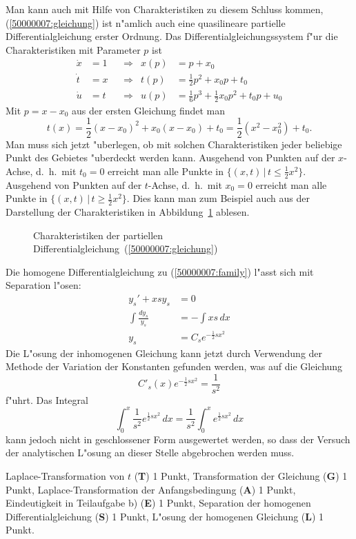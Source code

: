 \begin{loesung}
\begin{teilaufgaben}
Man kann auch mit Hilfe von Charakteristiken zu diesem Schluss kommen, 
(\ref{50000007:gleichung}) ist n"amlich auch eine quasilineare partielle
Differentialgleichung erster Ordnung.
Das Differentialgleichungssystem f"ur die Charakteristiken mit Parameter $p$
ist
\begin{align*}
\dot x&=1&&\Rightarrow&x(p)&=p+x_0\\
\dot t&=x&&\Rightarrow&t(p)&=\frac12p^2+x_0p+t_0\\
\dot u&=t&&\Rightarrow&u(p)&=\frac16p^3+\frac12x_0p^2+t_0p+u_0
\end{align*}
Mit $p=x-x_0$ aus der ersten Gleichung findet man
\[
t(x)=\frac12(x-x_0)^2+x_0(x-x_0)+t_0=\frac12(x^2-x_0^2)+t_0.
\]
Man muss sich jetzt "uberlegen, ob mit solchen Charakteristiken
jeder beliebige Punkt des Gebietes "uberdeckt werden kann.
Ausgehend von Punkten auf der $x$-Achse, d.~h.~mit $t_0=0$
erreicht man alle Punkte in $\{(x,t)\,|\, t\le \frac12x^2\}$.
Ausgehend von Punkten auf der $t$-Achse, d.~h.~mit $x_0=0$
erreicht man alle Punkte in $\{(x,t)\,|\, t\ge \frac12x^2\}$.
Dies kann man zum Beispiel auch aus der Darstellung
der Charakteristiken in Abbildung~\ref{50000007:bild}
ablesen.
\begin{figure}
\begin{center}
\end{center}
\caption{Charakteristiken der partiellen
Differentialgleichung~(\ref{50000007:gleichung})
\label{50000007:bild}}
\end{figure}
\item
Die homogene Differentialgleichung zu (\ref{50000007:family}) l"asst sich
mit Separation l"osen:
\begin{align*}
y_s'  + xsy_s&=0
\\
\int\frac{dy_s}{y_s}&=-\int xs\,dx
\\
y_s&=C_se^{-\frac12sx^2}
\end{align*}
Die L"osung der inhomogenen Gleichung kann jetzt durch Verwendung der
Methode der Variation der Konstanten gefunden werden, was auf die
Gleichung 
\[
C'_s(x)e^{-\frac12sx^2}=\frac1{s^2}
\]
f"uhrt.
Das Integral 
\[
\int_0^x\frac1{s^2}e^{\frac12sx^2}\,dx
=\frac1{s^2}
\int_0^xe^{\frac12sx^2}\,dx
\]
kann jedoch nicht in geschlossener Form ausgewertet werden, so dass der
Versuch der analytischen L"osung an dieser Stelle abgebrochen werden muss.
\end{teilaufgaben}
\end{loesung}

\begin{bewertung}
Laplace-Transformation von $t$ ({\bf T}) 1 Punkt,
Transformation der Gleichung ({\bf G}) 1 Punkt,
Laplace-Transformation der Anfangsbedingung ({\bf A}) 1 Punkt,
Eindeutigkeit in Teilaufgabe b) ({\bf E}) 1 Punkt,
Separation der homogenen Differentialgleichung ({\bf S}) 1 Punkt,
L"osung der homogenen Gleichung ({\bf L}) 1 Punkt.
\end{bewertung}
